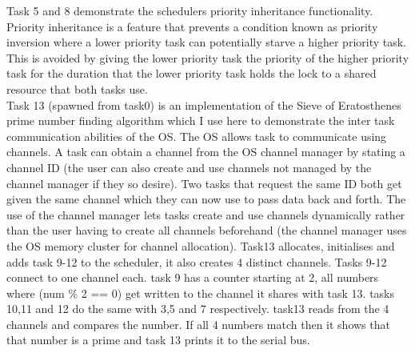 \documentclass[12pt,a4paper]{article}
\begin{document}
Task 5 and 8 demonstrate the schedulers priority inheritance functionality. Priority inheritance is a feature that prevents a condition known as priority inversion where a lower priority task can potentially starve a higher priority task. This is avoided by giving the lower priority task the priority of the higher priority task for the duration that the lower priority task holds the lock to a shared resource that both tasks use. \\

Task 13 (spawned from task0) is an implementation of the Sieve of Eratosthenes prime number finding algorithm which I use here to demonstrate the inter task communication abilities of the OS. The OS allows task to communicate using channels. A task can obtain a channel from the OS channel manager by stating a channel ID (the user can also create and use channels not managed by the channel manager if they so desire). Two tasks that request the same ID both get given the same channel which they can now use to pass data back and forth. The use of the channel manager lets tasks create and use channels dynamically rather than the user having to create all channels beforehand (the channel manager uses the OS memory cluster for channel allocation). Task13 allocates, initialises and adds task 9-12 to the scheduler, it also creates 4 distinct channels. Tasks 9-12 connect to one channel each. task 9 has a counter starting at 2, all numbers where (num \% 2 == 0) get written to the channel it shares with task 13. tasks 10,11 and 12 do the same with 3,5 and 7 respectively. task13 reads from the 4 channels and compares the number. If all 4 numbers match then it shows that that number is a prime and task 13 prints it to the serial bus.
\end{document}
